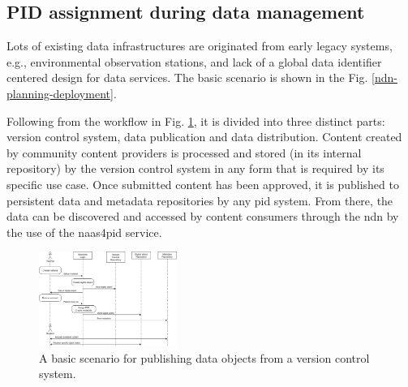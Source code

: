 \documentclass[conference]{IEEEtran}
\begin{document}



\subsection{PID assignment during data management}
Lots of existing data infrastructures are originated from early legacy systems, e.g., environmental observation stations, and lack of a global data identifier centered design for data services. The basic scenario is shown in the Fig. \ref{ndn-planning-deployment}. 

Following from the workflow in Fig. \ref{fig:sequence}, it is divided into three distinct parts: version control system, data publication and data distribution. Content created by community content providers is processed and stored (in its internal repository) by the version control system in any form that is required by its specific use case. Once submitted content has been approved, it is published to persistent data and metadata repositories by any \gls{pid} system. From there, the data can be discovered and accessed by content consumers through the \gls{ndn} by the use of the \gls{naas4pid} service.

\begin{figure}[ht]
\centering
\includegraphics[width=0.4\textwidth]{images/sequence.png}
\caption{A basic scenario for publishing data objects from a version control system. }
\label{fig:sequence}
\end{figure}
\end{document}
